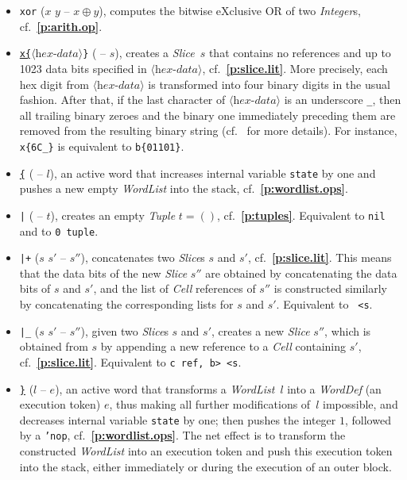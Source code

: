 \documentclass[12pt,oneside]{article}
\def\refpoint#1{{\rm\textbf{\ref{#1}}}}
\let\ptref=\refpoint
\begin{document}
\begin{itemize}
\item {\tt xor} ($x$ $y$ -- $x\oplus y$), computes the bitwise eXclusive OR of two {\em Integer\/}s, cf.~\ptref{p:arith.op}.
\item {\tt \underline{x\{}$\langle\textit{hex-data}\rangle$\}} ( -- $s$), creates a {\em Slice}~$s$ that contains no references and up to 1023 data bits specified in $\langle\textit{hex-data}\rangle$, cf.~\ptref{p:slice.lit}. More precisely, each hex digit from $\langle\textit{hex-data}\rangle$ is transformed into four binary digits in the usual fashion. After that, if the last character of $\langle\textit{hex-data}\rangle$ is an underscore {\tt \_}, then all trailing binary zeroes and the binary one immediately preceding them are removed from the resulting binary string (cf.~\cite[1.0]{TVM} for more details). For instance, {\tt x\{6C\_\}} is equivalent to {\tt b\{01101\}}.
\item {\tt \underline{\{}} ( -- $l$), an active word that increases internal variable {\tt state} by one and pushes a new empty {\em WordList\/} into the stack, cf.~\ptref{p:wordlist.ops}.
\item {\tt |} ( -- $t$), creates an empty {\em Tuple\/} $t=()$, cf.~\ptref{p:tuples}. Equivalent to {\tt nil} and to {\tt 0 tuple}.
\item {\tt |+} ($s$ $s'$ -- $s''$), concatenates two {\em Slice}\/s $s$ and $s'$, cf.~\ptref{p:slice.lit}. This means that the data bits of the new {\em Slice\/} $s''$ are obtained by concatenating the data bits of $s$ and $s'$, and the list of {\em Cell\/} references of $s''$ is constructed similarly by concatenating the corresponding lists for $s$ and $s'$. Equivalent to {\tt <b rot s, swap s, b> <s}.
\item {\tt |\_} ($s$ $s'$ -- $s''$), given two {\em Slice\/}s $s$ and $s'$, creates a new {\em Slice\/} $s''$, which is obtained from $s$ by appending a new reference to a {\em Cell\/} containing $s'$, cf.~\ptref{p:slice.lit}. Equivalent to {\tt <b rot s, swap s>c ref, b> <s}.
\item {\tt \underline{\}}} ($l$ -- $e$), an active word that transforms a {\em WordList\/}~$l$ into a {\em WordDef\/} (an execution token) $e$, thus making all further modifications of~$l$ impossible, and decreases internal variable {\tt state} by one; then pushes the integer $1$, followed by a {\tt 'nop}, cf.~\ptref{p:wordlist.ops}. The net effect is to transform the constructed {\em WordList\/} into an execution token and push this execution token into the stack, either immediately or during the execution of an outer block.
\end{itemize}
\end{document}
